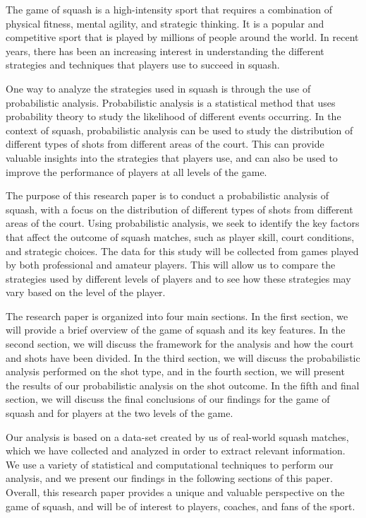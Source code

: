 \documentclass[10pt,conference]{IEEEtran}
\begin{document}
The game of squash is a high-intensity sport that requires a combination of physical fitness, mental agility, and strategic thinking. It is a popular and competitive sport that is played by millions of people around the world. In recent years, there has been an increasing interest in understanding the different strategies and techniques that players use to succeed in squash.

One way to analyze the strategies used in squash is through the use of probabilistic analysis. Probabilistic analysis is a statistical method that uses probability theory to study the likelihood of different events occurring. In the context of squash, probabilistic analysis can be used to study the distribution of different types of shots from different areas of the court. This can provide valuable insights into the strategies that players use, and can also be used to improve the performance of players at all levels of the game.

The purpose of this research paper is to conduct a probabilistic analysis of squash, with a focus on the distribution of different types of shots from different areas of the court. Using probabilistic analysis, we seek to identify the key factors that affect the outcome of squash matches, such as player skill, court conditions, and strategic choices. The data for this study will be collected from games played by both professional and amateur players. This will allow us to compare the strategies used by different levels of players and to see how these strategies may vary based on the level of the player.

The research paper is organized into four main sections. In the first section, we will provide a brief overview of the game of squash and its key features. In the second section, we will discuss the framework for the analysis and how the court and shots have been divided. In the third section, we will discuss the probabilistic analysis performed on the shot type, and in the fourth section, we will present the results of our probabilistic analysis on the shot outcome. In the fifth and final section, we will discuss the final conclusions of our findings for the game of squash and for players at the two levels of the game.

Our analysis is based on a data-set created by us of real-world squash matches, which we have collected and analyzed in order to extract relevant information. We use a variety of statistical and computational techniques to perform our analysis, and we present our findings in the following sections of this paper. Overall, this research paper provides a unique and valuable perspective on the game of squash, and will be of interest to players, coaches, and fans of the sport.
\end{document}
